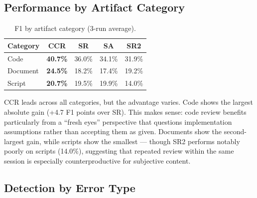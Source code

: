 \documentclass[11pt]{article}
\begin{document}
\subsection{Performance by Artifact Category}

\begin{table}[h]
\centering
\small
\begin{tabular}{lcccc}
\toprule
\textbf{Category} & \textbf{CCR} & \textbf{SR} & \textbf{SA} & \textbf{SR2} \\
\midrule
Code & \textbf{40.7\%} & 36.0\% & 34.1\% & 31.9\% \\
Document & \textbf{24.5\%} & 18.2\% & 17.4\% & 19.2\% \\
Script & \textbf{20.7\%} & 19.5\% & 19.9\% & 14.0\% \\
\bottomrule
\end{tabular}
\caption{F1 by artifact category (3-run average).}
\label{tab:category}
\end{table}

CCR leads across all categories, but the advantage varies. Code shows the largest absolute gain (+4.7 F1 points over SR). This makes sense: code review benefits particularly from a ``fresh eyes'' perspective that questions implementation assumptions rather than accepting them as given. Documents show the second-largest gain, while scripts show the smallest --- though SR2 performs notably poorly on scripts (14.0\%), suggesting that repeated review within the same session is especially counterproductive for subjective content.

\subsection{Detection by Error Type}

\begin{table}[h]
\centering
\small
{}
\caption{Detection rate by error type ($N$=90 per cell).}
\label{tab:errortype}
\end{table}
\end{document}
